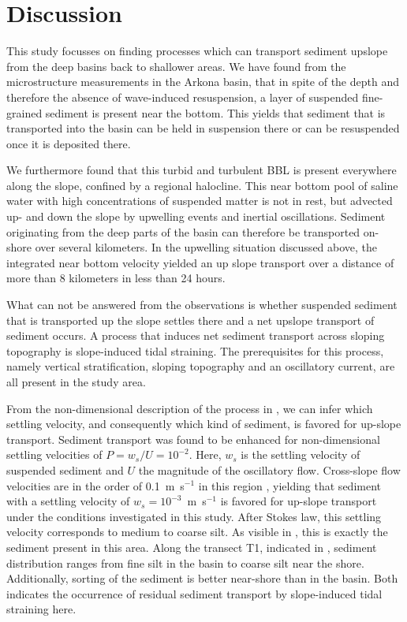 \section{Discussion}

This study focusses on finding processes which can transport sediment upslope 
from the deep basins back to shallower areas. We have found from the 
microstructure measurements in the Arkona basin, that in spite of the depth and 
therefore the absence of wave-induced resuspension, a layer of 
suspended fine-grained sediment is present near the bottom. This yields that 
sediment that is transported into the basin can be held in suspension there 
or can be resuspended once it is deposited there.

We furthermore found that this turbid and turbulent BBL is present everywhere 
along the slope, confined by a regional halocline. This near bottom pool of 
saline water with high concentrations of suspended matter is not in rest, but 
advected up- and down the slope by upwelling events and inertial oscillations. 
Sediment originating from the deep parts of the basin can therefore be 
transported on-shore over several kilometers. In the upwelling situation 
discussed above, the integrated near bottom velocity yielded an up slope 
transport over a distance of more than 8 kilometers in less than 24 hours. 

What can not be answered from the observations is whether suspended sediment 
that is transported up the slope settles there and a net upslope transport of 
sediment occurs. A process that induces net sediment transport across sloping 
topography is slope-induced tidal straining. The prerequisites for this 
process, namely vertical stratification, sloping topography and an oscillatory 
current, are all present in the study area. 

From the non-dimensional description of the process in \cite{schulzumlauf2016}, 
we can infer which settling velocity, and consequently which kind of sediment, 
is favored for up-slope transport. Sediment transport was found 
to be enhanced for non-dimensional settling velocities of $P= w_s \slash U = 
10^{-2}$. Here, $w_s$ is the settling velocity of suspended sediment and $U$ 
the magnitude of the oscillatory flow. Cross-slope flow velocities are in the 
order of 0.1~m~s$^{-1}$ in this region \citep[][]{lass1993}, yielding that 
sediment with a settling velocity of $w_s=10^{-3}$~m~s$^{-1}$ is favored for 
up-slope transport under the conditions investigated in this study. After 
Stokes law, this settling velocity corresponds to medium to coarse silt. As 
visible in , this is exactly the sediment present in this 
area. Along the transect T1, indicated in , sediment 
distribution ranges from fine silt in the basin to coarse silt near the shore. 
Additionally, sorting of the sediment is better near-shore than in the basin. 
Both indicates the occurrence of residual sediment transport by slope-induced 
tidal straining here.

